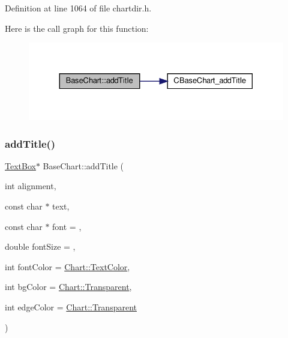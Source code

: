 Definition at line 1064 of file chartdir.\+h.

Here is the call graph for this function\+:
\nopagebreak
\begin{figure}[H]
\begin{center}
\leavevmode
\includegraphics[width=330pt]{class_base_chart_a06e200a95fd2a9c00522b896a6ff5dc5_cgraph}
\end{center}
\end{figure}
\mbox{\label{class_base_chart_accd91106cbf8ca45cd8725b0ed2bb833}} 
\subsubsection{\texorpdfstring{add\+Title()}{addTitle()}\hspace{0.1cm}{\footnotesize\ttfamily [2/2]}}
{\footnotesize\ttfamily \hyperlink{class_text_box}{Text\+Box}$\ast$ Base\+Chart\+::add\+Title (\begin{DoxyParamCaption}\item[{int}]{alignment,  }\item[{const char $\ast$}]{text,  }\item[{const char $\ast$}]{font = {},  }\item[{double}]{font\+Size = {},  }\item[{int}]{font\+Color = {\ttfamily \hyperlink{namespace_chart_abee0d882fdc9ad0b001245ad9fc64011a879e14f2f5024caccc047374342321ef}{Chart\+::\+Text\+Color}},  }\item[{int}]{bg\+Color = {\ttfamily \hyperlink{namespace_chart_abee0d882fdc9ad0b001245ad9fc64011afc6811800a9e2582dac0157b6279f836}{Chart\+::\+Transparent}},  }\item[{int}]{edge\+Color = {\ttfamily \hyperlink{namespace_chart_abee0d882fdc9ad0b001245ad9fc64011afc6811800a9e2582dac0157b6279f836}{Chart\+::\+Transparent}} }\end{DoxyParamCaption})\hspace{0.3cm}{\ttfamily [inline]}}



